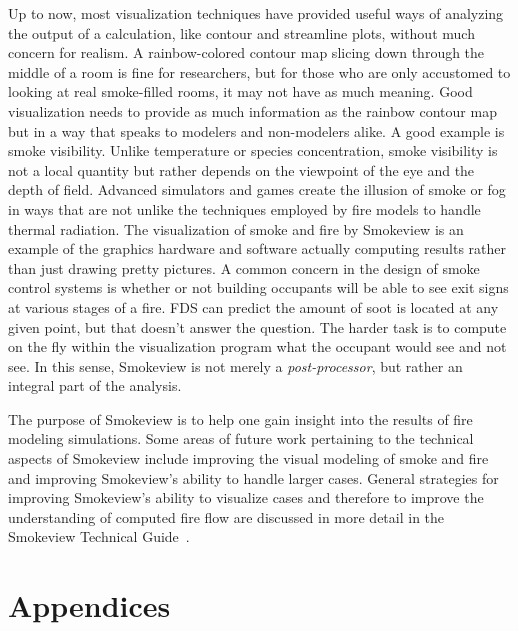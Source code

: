 \documentclass[11pt,twoside]{book}
\begin{document}
Up to now, most visualization techniques have provided useful ways
of analyzing the output of a calculation, like contour and
streamline plots, without much concern for realism. A
rainbow-colored contour map slicing down through the middle of a
room is fine for researchers, but for those who are only
accustomed to looking at real smoke-filled rooms, it may not have
as much meaning. Good visualization needs to provide as much
information as the rainbow contour map but in a way that speaks to
modelers and non-modelers alike. A good example is smoke
visibility. Unlike temperature or species concentration, smoke
visibility is not a local quantity but rather depends on the
viewpoint of the eye and the depth of field. Advanced simulators
and games create the illusion of smoke or fog in ways that are not
unlike the techniques employed by fire models to handle thermal
radiation. The visualization of smoke and fire by Smokeview is an
example of the graphics hardware and software actually computing
results rather than just drawing pretty pictures. A common concern
in the design of smoke control systems is whether or not building
occupants will be able to see exit signs at various stages of a
fire. FDS can predict the amount of soot is located at any given
point, but that doesn't answer the question. The harder task is to
compute on the fly within the visualization program what the
occupant would see and not see. In this sense, Smokeview is not
merely a {\em post-processor}, but rather an integral part of the
analysis.

The purpose of Smokeview is to help one gain insight into the results
of fire modeling simulations.
Some areas of future work pertaining to the technical aspects of
Smokeview include improving the visual modeling of smoke and fire
and improving Smokeview's ability to handle larger cases.
General strategies for improving Smokeview's ability to visualize
cases and therefore to improve the understanding of computed fire
flow are discussed in more detail in the
Smokeview Technical Guide~\cite{Smokeview_Tech_Guide}.


\printbibliography[heading=bibintoc,title={References}]



\part{Appendices}
\appendix
{}

\end{document}
